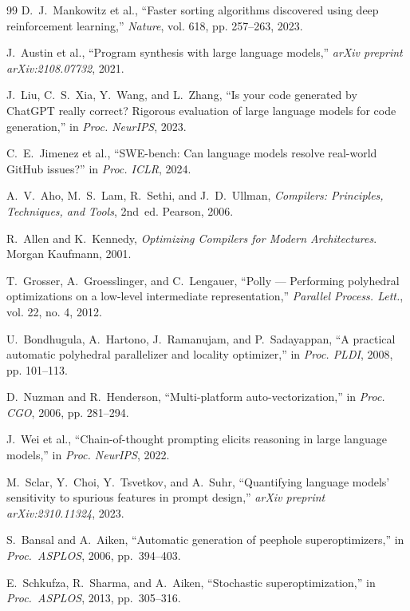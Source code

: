 \begin{thebibliography}{99}
D.~J.~Mankowitz et al., ``Faster sorting algorithms discovered using deep reinforcement learning,'' \textit{Nature}, vol. 618, pp. 257--263, 2023.

J.~Austin et al., ``Program synthesis with large language models,'' \textit{arXiv preprint arXiv:2108.07732}, 2021.

J.~Liu, C.~S.~Xia, Y.~Wang, and L.~Zhang, ``Is your code generated by ChatGPT really correct? Rigorous evaluation of large language models for code generation,'' in \textit{Proc. NeurIPS}, 2023.

C.~E.~Jimenez et al., ``SWE-bench: Can language models resolve real-world GitHub issues?'' in \textit{Proc. ICLR}, 2024.

A.~V.~Aho, M.~S.~Lam, R.~Sethi, and J.~D.~Ullman, \textit{Compilers: Principles, Techniques, and Tools}, 2nd~ed. Pearson, 2006.

R.~Allen and K.~Kennedy, \textit{Optimizing Compilers for Modern Architectures}. Morgan Kaufmann, 2001.

T.~Grosser, A.~Groesslinger, and C.~Lengauer, ``Polly --- Performing polyhedral optimizations on a low-level intermediate representation,'' \textit{Parallel Process. Lett.}, vol. 22, no. 4, 2012.

U.~Bondhugula, A.~Hartono, J.~Ramanujam, and P.~Sadayappan, ``A practical automatic polyhedral parallelizer and locality optimizer,'' in \textit{Proc. PLDI}, 2008, pp. 101--113.

D.~Nuzman and R.~Henderson, ``Multi-platform auto-vectorization,'' in \textit{Proc. CGO}, 2006, pp. 281--294.

J.~Wei et al., ``Chain-of-thought prompting elicits reasoning in large language models,'' in \textit{Proc. NeurIPS}, 2022.

M.~Sclar, Y.~Choi, Y.~Tsvetkov, and A.~Suhr, ``Quantifying language models' sensitivity to spurious features in prompt design,'' \textit{arXiv preprint arXiv:2310.11324}, 2023.

S.~Bansal and A.~Aiken, ``Automatic generation of peephole superoptimizers,'' in \textit{Proc.\ ASPLOS}, 2006, pp.~394--403.

E.~Schkufza, R.~Sharma, and A.~Aiken, ``Stochastic superoptimization,'' in \textit{Proc.\ ASPLOS}, 2013, pp.~305--316.


\end{thebibliography}

